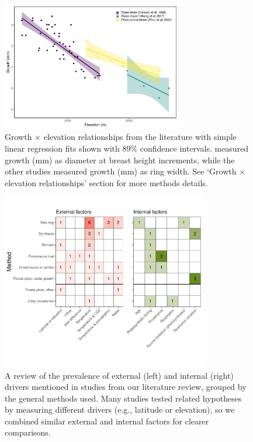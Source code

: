\documentclass[11pt]{article}
\begin{document}
\begin{figure}[h!]
\includegraphics[width=0.7\textwidth]{..//analyses/growthxelevationetc/figures/growthbyelevation_plot.pdf} %
\caption{Growth $\times$ elevation relationships from the literature with simple linear regression fits shown with 89\% confidence intervals. \citet{oleksyn1998growth} measured growth (mm) as diameter at breast height increments, while the other studies \citep{wang2017climatic,zhou2022altitudinal} measured growth (mm) as ring width. See `Growth $\times$ elevation relationships' section for more methods details.} %
\label{fig:gxelev}
\end{figure}

\begin{figure}[h!]
\includegraphics[width=0.8\textwidth]{..//figures/heatmaps/heatmap_combined_endo&exo.pdf}
\caption{A review of the prevalence of external (left) and internal (right) drivers mentioned in studies from our literature review, grouped by the general methods used. Many studies tested related hypotheses by measuring different drivers (e.g., latitude or elevation), so we combined similar external and internal factors for clearer comparisons.}
\label{fig:heatmapssupp}
\end{figure}
\end{document}
